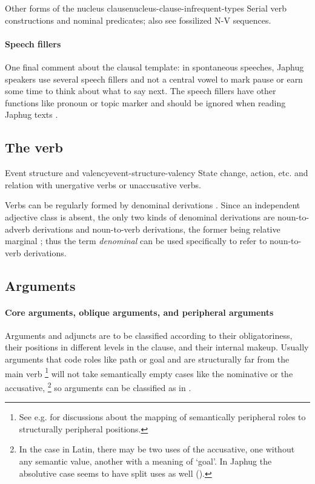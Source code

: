 \documentclass[a4paper, oneside, 12pt]{report}
\newcommand*{\citesec}[1]{\S~{#1}}
\newcommand*{\citechap}[1]{Ch~{#1}}
\newcommand*{\citepage}[1]{p.~{#1}}
\newcommand*{\term}[1]{\emph{#1}}
\newcommand{\translate}[1]{`#1'}
\begin{document}
\begin{todobox}{Other forms of the nucleus clause}{nucleus-clause-infrequent-types}
    Serial verb constructions and nominal predicates;
    also see fossilized N-V sequences. 
\end{todobox}

\paragraph*{Speech fillers}
One final comment about the clausal template:
in spontaneous speeches, Japhug speakers use several speech fillers and not a central vowel 
to mark pause or earn some time to think about what to say next.
The speech fillers have other functions like pronoun or topic marker
and should be ignored when reading Japhug texts
\citep[\citesec{10.3}]{jacques2021grammar}.

\subsection{The verb}

\begin{todobox}{Event structure and valency}{event-structure-valency}
    State change, action, etc. and relation with unergative verbs or unaccusative verbs.
\end{todobox}

Verbs can be regularly formed by denominal derivations
\citep[\citechap{20}]{jacques2021grammar}.
Since an independent adjective class is absent, 
the only two kinds of denominal derivations 
are noun-to-adverb derivations and noun-to-verb derivations,
the former being relative marginal \citep[\citepage{1011}]{jacques2021grammar};
thus the term \term{denominal} can be used specifically 
to refer to noun-to-verb derivations.

\subsection{Arguments}\label{sec:grammatical.clause.internal}

\paragraph*{Core arguments, oblique arguments, and peripheral arguments}
\label{sec:grammatical.clause.internal.core-oblique}
Arguments and adjuncts are to be classified according to 
their obligatoriness, their positions in different levels in the clause,
and their internal makeup.
Usually arguments that code roles like path or goal
and are structurally far from the main verb%
\footnote{
    See e.g. \citet[\citepage{30}]{cinque1999adverbs}
    for discussions about the mapping of semantically peripheral roles
    to structurally peripheral positions.
}
will not take semantically empty cases like the nominative or the accusative,%
\footnote{
    In the case in Latin, there may be two uses of the accusative,
    one without any semantic value,
    another with a meaning of \translate{goal}.
    In Japhug the absolutive case seems to have split uses as well
    (). 
}
so arguments can be classified as in .
\end{document}
